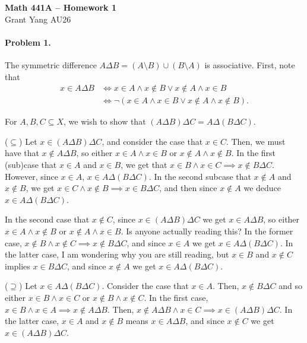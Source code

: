 \documentclass[12pt]{article}
\begin{document}
\begin{center} {\large \textbf{Math 441A -- Homework 1}} \smallskip \\ 
    Grant Yang \hspace{1em} AU26
 \end{center}

\paragraph{Problem 1.} The symmetric difference $A \Delta B = (A \setminus B) \cup (B \setminus A)$ is associative. First, note that
\begin{align*}
    x \in A \Delta B &\iff x \in A \land x \not\in B \lor x \not\in A \land x \in B \\
    &\iff \lnot(x \in A \land x \in B \lor x \not\in A \land x \not\in B).
\end{align*}


For $A,B,C\subseteq X$, we wish to show that $(A \Delta B) \Delta C = A \Delta (B \Delta C)$.

($\subseteq$) Let $x \in (A \Delta B) \Delta C$, and consider the case that $x \in C$. Then, we must have that $x \not\in A \Delta B$, so either $x \in A \land x \in B$ or $x \not\in A \land x \not\in B$. In the first (sub)case that $x \in A$ and $x \in B$, we get that $x \in B \land x \in C \implies x \not\in B \Delta C$. However, since $x \in A$, $x \in A \Delta (B \Delta C)$. In the second subcase that $x \not\in A$ and $x \not\in B$, we get $x \in C \land x \not\in B \implies x \in B \Delta C$, and then since $x \not\in A$ we deduce $x \in A \Delta (B \Delta C)$. 

In the second case that $x \not\in C$, since $x \in (A\Delta B)\Delta C$ we get $x \in A \Delta B$, so either $x \in A \land x \not\in B$ or $x \not\in A \land x \in B$. Is anyone actually reading this? In the former case, $x \not\in B \land x \not\in C \implies x \not\in B \Delta C$, and since $x \in A$ we get $x \in A \Delta (B \Delta C)$. In the latter case, I am wondering why you are still reading, but $x \in B$ and $x \not\in C$ implies $x \in B \Delta C$, and since $x \not\in A$ we get $x \in A \Delta (B\Delta C)$.

($\supseteq$) Let $x \in A \Delta (B \Delta C)$. Consider the case that $x \in A$. Then, $x \not\in B \Delta C$ and so either $x \in B \land x \in C$ or $x \not\in B \land x \not\in C$. In the first case, $x \in B \land x \in A \implies x \not\in A \Delta B$. Then, $x \not\in A \Delta B \land x \in C \implies x \in (A\Delta B) \Delta C$. In the latter case, $x\in A$ and $x \not\in B$ means $x \in A \Delta B$, and since $x \not\in C$ we get $x \in (A \Delta B) \Delta C$.
\end{document}

